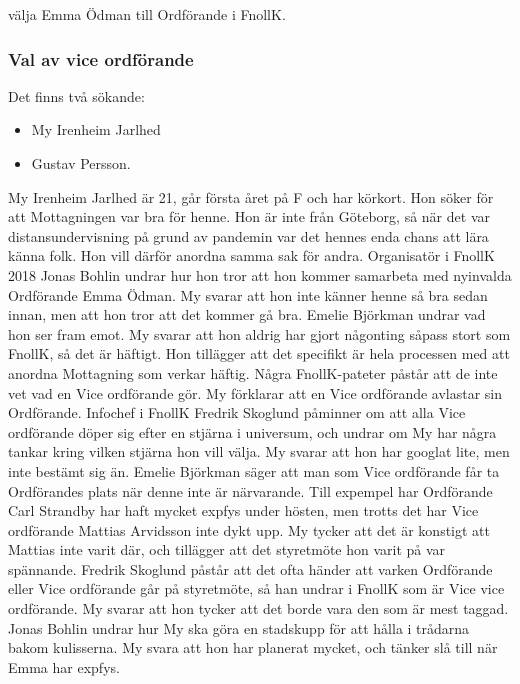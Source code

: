 \documentclass[hidelinks]{sektionsmote} %
\begin{document}
\begin{beslut}
  \item välja Emma Ödman till Ordförande i FnollK.
\end{beslut}

\subsubsection{Val av vice ordförande}
Det finns två sökande:
\begin{itemize}
    \item My Irenheim Jarlhed
    \item Gustav Persson.
\end{itemize}

My Irenheim Jarlhed är 21, går första året på F och har körkort.
Hon söker för att Mottagningen var bra för henne.
Hon är inte från Göteborg, så när det var distansundervisning på grund av pandemin var det hennes enda chans att lära känna folk.
Hon vill därför anordna samma sak för andra.
Organisatör i FnollK 2018 Jonas Bohlin undrar hur hon tror att hon kommer samarbeta med nyinvalda Ordförande Emma Ödman.
My svarar att hon inte känner henne så bra sedan innan, men att hon tror att det kommer gå bra.
Emelie Björkman undrar vad hon ser fram emot.
My svarar att hon aldrig har gjort någonting såpass stort som FnollK, så det är häftigt.
Hon tillägger att det specifikt är hela processen med att anordna Mottagning som verkar häftig.
Några FnollK-pateter påstår att de inte vet vad en Vice ordförande gör.
My förklarar att en Vice ordförande avlastar sin Ordförande.
Infochef i FnollK Fredrik Skoglund påminner om att alla Vice ordförande döper sig efter en stjärna i universum, och undrar om My har några tankar kring vilken stjärna hon vill välja.
My svarar att hon har googlat lite, men inte bestämt sig än.
Emelie Björkman säger att man som Vice ordförande får ta Ordförandes plats när denne inte är närvarande.
Till expempel har Ordförande Carl Strandby har haft mycket expfys under hösten, men trotts det har Vice ordförande Mattias Arvidsson inte dykt upp.
My tycker att det är konstigt att Mattias inte varit där, och tillägger att det styretmöte hon varit på var spännande.
Fredrik Skoglund påstår att det ofta händer att varken Ordförande eller Vice ordförande går på styretmöte, så han undrar i FnollK som är Vice vice ordförande.
My svarar att hon tycker att det borde vara den som är mest taggad.
Jonas Bohlin undrar hur My ska göra en stadskupp för att hålla i trådarna bakom kulisserna.
My svara att hon har planerat mycket, och tänker slå till när Emma har expfys.
\end{document}
